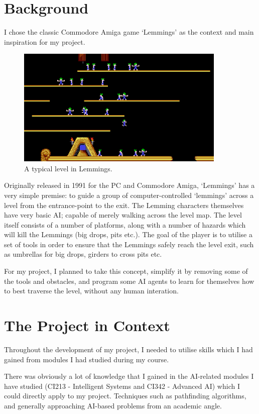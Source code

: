 \documentclass[a4paper,oneside]{report}
\begin{document}
\section{Background}

I chose the classic Commodore Amiga game `Lemmings' as the context and main inspiration for my project.

\begin{figure}[h!]
  \centering
    \includegraphics[width=100mm]{sources/images/lemmings3}
    \caption{A typical level in Lemmings.\label{screen}}
\end{figure}

Originally released in 1991 for the PC and Commodore Amiga, `Lemmings' has a very simple premise: to guide a group of computer-controlled `lemmings’ across a level from the entrance-point to the exit. The Lemming characters themselves have very basic AI; capable of merely walking across the level map. The level itself consists of a number of platforms, along with a number of hazards which will kill the Lemmings (big drops, pits etc.). The goal of the player is to utilise a set of tools in order to ensure that the Lemmings safely reach the level exit, such as umbrellas for big drops, girders to cross pits etc. 

For my project, I planned to take this concept, simplify it by removing some of the tools and obstacles, and program some AI agents to learn for themselves how to best traverse the level, without any human interation.
		
\section{The Project in Context}
	
Throughout the development of my project, I needed to utilise skills which I had gained from modules I had studied during my course.

There was obviously a lot of knowledge that I gained in the AI-related modules I have studied (CI213 - Intelligent Systems and CI342 - Advanced AI) which I could directly apply to my project. Techniques such as pathfinding algorithms, and generally approaching AI-based problems from an academic angle.
\end{document}
